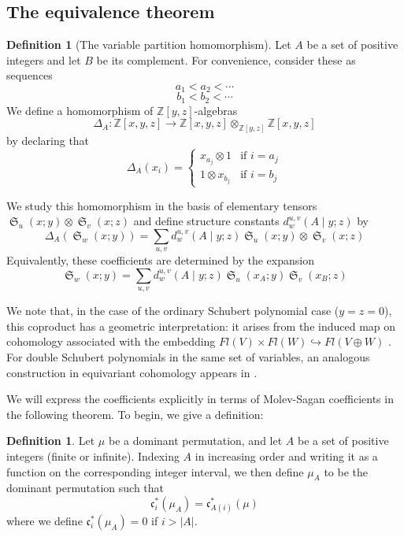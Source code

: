 \documentclass{amsart}
\theoremstyle{definition}
\newtheorem{definition}[lemma]{Definition}
\theoremstyle{remark}
\numberwithin{equation}{subsection}
\DeclareMathOperator{\sch}{\mathfrak{S}}
\newcommand{\cpcf}[5]{d^{#1,#2}_{#3}\left(#4\mid #5\right)}
\newcommand{\code}{\mathfrak{c}}
\begin{document}
\subsection{The equivalence theorem}

\begin{definition}[The variable partition homomorphism] \label{definition:coprod}
Let $A$ be a set of positive integers and let $B$ be its complement. For convenience, consider these as sequences
$$a_1<a_2<\cdots$$
$$b_1<b_2<\cdots$$
We define a homomorphism of $\mathbb{Z}[y,z]$-algebras
$$\Delta_A:\mathbb{Z}[x,y,z]\to\mathbb{Z}[x,y,z]\otimes_{\mathbb{Z}[y,z]}\mathbb{Z}[x,y,z]$$
by declaring that
$$\Delta_A(x_i)=\begin{cases}x_{a_j}\otimes 1 & \text{if }i=a_j\\1\otimes x_{b_j} & \text{if }i=b_j\end{cases}$$

We study this homomorphism in the basis of elementary tensors $\sch_u(x;y)\otimes \sch_v(x;z)$ and define structure constants $\cpcf{u}{v}{w}{A}{y;z}$ by
$$\Delta_A(\sch_w(x;y))=\sum_{u,v}\cpcf{u}{v}{w}{A}{y;z}\sch_u(x;y)\otimes \sch_v(x;z)$$
Equivalently, these coefficients are determined by the expansion
$$\sch_w(x;y)=\sum_{u,v} \cpcf{u}{v}{w}{A}{y;z}\sch_u(x_A;y)\sch_v(x_B;z)$$

We note that, in the case of the ordinary Schubert polynomial case ($y=z=0$), this coproduct has a geometric interpretation: it arises from the induced map on cohomology associated with the embedding $Fl(V)\times Fl(W)\hookrightarrow Fl(V\oplus W)$ \cite{coprod}. For double Schubert polynomials in the same set of variables, an analogous construction in equivariant cohomology appears in \cite{anderson2023strong}.
\end{definition}

We will express the coefficients explicitly in terms of Molev-Sagan coefficients in the following theorem. To begin,  we give a definition:



\begin{definition} \label{definition:mua}
Let $\mu$ be a dominant permutation, and let $A$ be a set of positive integers (finite or infinite). Indexing $A$ in increasing order and writing it as a function on the corresponding integer interval, we then define $\mu_A$ to be the dominant permutation such that
$$\code_i^*(\mu_A)=\code_{A(i)}^*(\mu)$$
where we define $\code_i^*(\mu_A)=0$ if $i>|A|$.
\end{definition}
\end{document}
